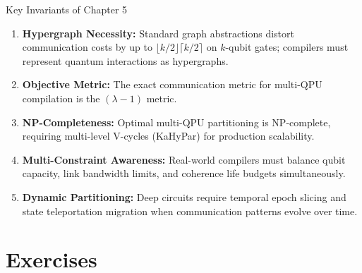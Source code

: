 
\begin{summarybox}{Key Invariants of Chapter 5}
\begin{enumerate}
    \item \textbf{Hypergraph Necessity:} Standard graph abstractions distort communication costs by up to $\lfloor k/2 \rfloor \lceil k/2 \rceil$ on $k$-qubit gates; compilers must represent quantum interactions as hypergraphs.
    \item \textbf{Objective Metric:} The exact communication metric for multi-QPU compilation is the $(\lambda - 1)$ metric.
    \item \textbf{NP-Completeness:} Optimal multi-QPU partitioning is NP-complete, requiring multi-level V-cycles (KaHyPar) for production scalability.
    \item \textbf{Multi-Constraint Awareness:} Real-world compilers must balance qubit capacity, link bandwidth limits, and coherence life budgets simultaneously.
    \item \textbf{Dynamic Partitioning:} Deep circuits require temporal epoch slicing and state teleportation migration when communication patterns evolve over time.
\end{enumerate}
\end{summarybox}


\section*{Exercises}

